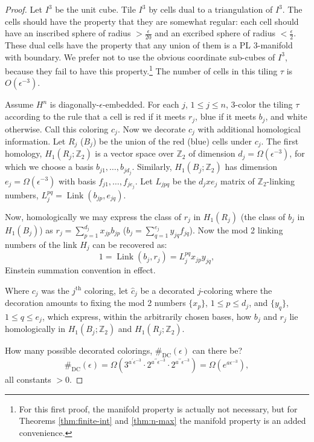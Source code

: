 \documentclass[12pt]{amsart}
\newcommand{\cd}{\cdot}
\newcommand{\pr}{\prime}
\newcommand{\Z}{\mathbb{Z}}
\theoremstyle{definition}
\theoremstyle{remark}
\begin{document}
\begin{proof}
	Let $I^3$ be the unit cube. Tile $I^3$ by cells dual to a triangulation of $I^3$. The cells should have the property that they are somewhat regular: each cell should have an inscribed sphere of radius $> \frac{\epsilon}{20}$ and an excribed sphere of radius $< \frac{\epsilon}{2}$. These dual cells have the property that any union of them is a PL 3-manifold with boundary. We prefer not to use the obvious coordinate sub-cubes of $I^3$, because they fail to have this property.\footnote{For this first proof, the manifold property is actually not necessary, but for Theorems \ref{thm:finite-int} and \ref{thm:n-max} the manifold property is an added convenience.} The number of cells in this tiling $\tau$ is $O(\epsilon^{-3})$.

	Assume $H^n$ is diagonally-$\epsilon$-embedded. For each $j$, $1 \leq j \leq n$, 3-color the tiling $\tau$ according to the rule that a cell is red if it meets $r_j$, blue if it meets $b_j$, and white otherwise. Call this coloring $c_j$. Now we decorate $c_j$ with additional homological information. Let $R_j$ ($B_j$) be the union of the red (blue) cells under $c_j$. The first homology, $H_1(R_j; \Z_2)$ is a vector space over $\Z_2$ of dimension $d_j = \Omega(\epsilon^{-3})$, for which we choose a basis $b_{j1}, \dots, b_{jd_j}$. Similarly, $H_1(B_j; \Z_2)$ has dimension $e_j = \Omega(\epsilon^{-3})$ with basis $f_{j1}, \dots, f_{je_j}$. Let $L_{jpq}$ be the $d_j x e_j$ matrix of $\Z_2$-linking numbers, $L_j^{pq} = \operatorname{Link}(b_{jp},e_{jq})$.

	Now, homologically we may express the class of $r_j$ in $H_1(R_j)$ (the class of $b_j$ in $H_1(B_j)$) as $r_j = \sum_{p=1}^{d_j} x_{jp}b_{jp}$ ($b_j = \sum_{q=1}^{e_j} y_{jq}f_{jq}$). Now the mod 2 linking numbers of the link $H_j$ can be recovered as:
	\begin{equation}\label{eq:link-numbers}
		1 = \operatorname{Link}(b_j, r_j) = L_j^{pq}x_{jp}y_{jq},
	\end{equation}
	Einstein summation convention in effect.

	Where $c_j$ was the $j^{\text{th}}$ coloring, let $\hat{c}_j$ be a decorated $j$-coloring where the decoration amounts to fixing the mod 2 numbers $\{x_p\}$, $1 \leq p \leq d_j$, and $\{y_q\}$, $1 \leq q \leq e_j$, which express, within the arbitrarily chosen bases, how $b_j$ and $r_j$ lie homologically in $H_1(B_j; \Z_2)$ and $H_1(R_j; \Z_2)$.

	How many possible decorated colorings, $\#_{\text{DC}}(\epsilon)$ can there be?
	\begin{equation}
		\#_{\text{DC}}(\epsilon) = \Omega\left(3^{a^\pr \epsilon^{-3}} \cd 2^{a^{\pr\pr} \epsilon^{-3}} \cd 2^{a^{\pr\pr} \epsilon^{-3}}\right) = \Omega\left(e^{a \epsilon^{-3}}\right),
	\end{equation}
	all constants $> 0$.


\end{proof}
\end{document}
